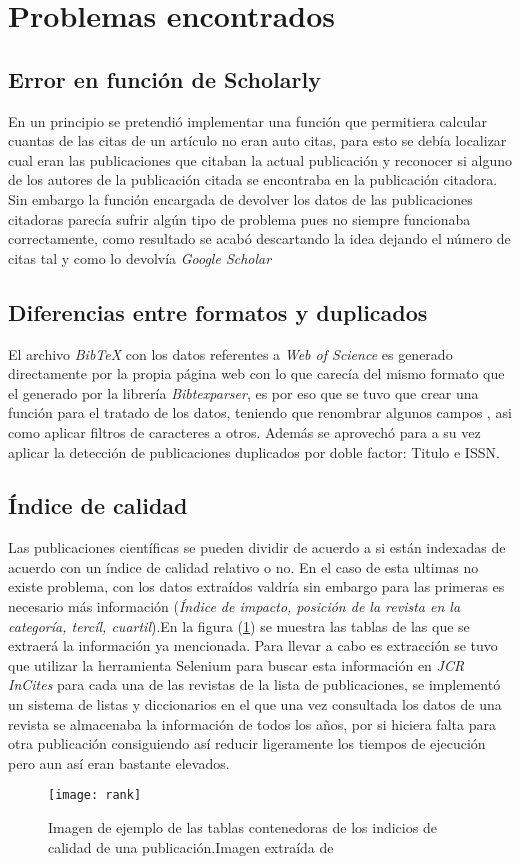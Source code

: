 \section{Problemas encontrados}
\subsection{Error en función de Scholarly}
En un principio se pretendió implementar una función que permitiera calcular cuantas de las citas de un artículo no eran auto citas, para esto se debía localizar cual eran las publicaciones que citaban la actual publicación y reconocer si alguno de los autores de la publicación citada se encontraba en la publicación citadora. Sin embargo la función encargada de devolver los datos de las publicaciones citadoras parecía sufrir algún tipo de problema pues no siempre funcionaba correctamente, como resultado se acabó descartando la idea dejando el número de citas tal y como lo devolvía \emph{Google Scholar}
\subsection{Diferencias entre formatos y duplicados}
El archivo \emph{BibTeX} con los datos referentes a \emph{Web of Science} es generado directamente por la propia página web con lo que carecía del mismo formato que el generado por la librería \emph{Bibtexparser}, es por eso que se tuvo que crear una función para el tratado de los datos, teniendo que renombrar algunos campos , asi como aplicar filtros de caracteres a otros. Además se aprovechó para a su vez aplicar la detección de publicaciones duplicados por doble factor: Titulo e ISSN.
\subsection{Índice de calidad}
Las publicaciones científicas se pueden dividir de acuerdo a si están indexadas de acuerdo con un índice de calidad relativo o no. En el caso de esta ultimas no existe problema, con los datos extraídos valdría sin embargo para las primeras es necesario más información (\emph{Índice de impacto, posición de la revista en la categoría, tercíl, cuartil}).En la figura (\ref{fig:rank}) se muestra las tablas de las que se extraerá la información ya mencionada. Para llevar a cabo es extracción se tuvo que utilizar la herramienta Selenium para buscar esta información en \emph{JCR InCites}\cite{jcr} para cada una de las revistas de la lista de publicaciones, se implementó un sistema de listas y diccionarios en el que una vez consultada los datos de una revista se almacenaba la información de todos los años, por si hiciera falta para otra publicación consiguiendo así reducir ligeramente los tiempos de ejecución pero aun así eran bastante elevados.
\begin{figure}[H]
	\centering
	\texttt{[image: rank]}
	\caption{Imagen de ejemplo de las tablas contenedoras de los indicios de calidad de una publicación.Imagen extraída de \cite{jcr_img}}
	\label{fig:rank}
\end{figure}
